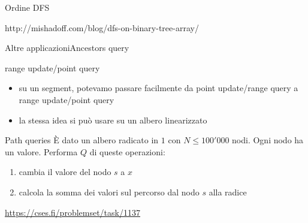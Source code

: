 \documentclass[compress]{beamer}
\begin{document}
\begin{frame}{Ordine DFS}
    \begin{center}
    \tiny{http://mishadoff.com/blog/dfs-on-binary-tree-array/}
    \end{center}
\end{frame}

\begin{frame}{Altre applicazioni}{Ancestors query}
    \begin{block}{range update/point query}
        \begin{itemize}
            \item su un segment, potevamo passare facilmente da point update/range query a range update/point query
            \item la stessa idea si pu\`o usare su un albero linearizzato
        \end{itemize}
    \end{block}
    \pause
    \begin{exampleblock}{Path queries}
        \`E dato un albero radicato in $1$ con $N \leq 100'000$ nodi. Ogni nodo ha un valore. Performa $Q$ di queste operazioni:
        \begin{enumerate}
            \item cambia il valore del nodo $s$ a $x$
            \item calcola la somma dei valori sul percorso dal nodo $s$ alla radice
        \end{enumerate}
    \small{\underline{\url{https://cses.fi/problemset/task/1137}}}
    \end{exampleblock}
\end{frame}
\end{document}

